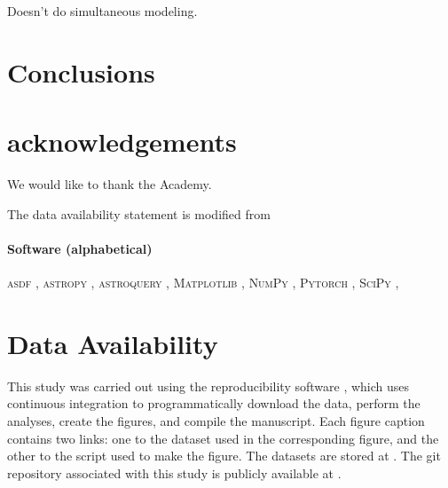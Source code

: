 \documentclass[twocolumn]{aastex631}
\newcommand{\package}[1]{\textsc{#1}}
\begin{document}
            Doesn't do simultaneous modeling.
    


\section{Conclusions} \label{sec:conclusions}




\section{acknowledgements}

    We would like to thank the Academy.

    The data availability statement is modified from 

    \paragraph{Software (alphabetical)}

        \package{asdf} \citep{Greenfield2015},
        \package{astropy} \citep{Astropy2013, Astropy2018, Astropy2022},
        \package{astroquery} \citep{Astroquery2019},
        \package{Matplotlib} \citep{Hunter2007},
        \package{NumPy} \citep{Harris2020},
        \package{Pytorch} \citep{Pytorch2019},
        \package{SciPy} \citep{Scipy2020},


\section*{Data Availability} \label{sec:data_availability}

    This study was carried out using the reproducibility software
    \href{https://github.com/showyourwork/showyourwork}{\showyourwork}
    \citep{Luger2021}, which uses continuous integration to
    programmatically download the data, perform the analyses, create the
    figures, and compile the manuscript. Each figure caption contains two links:
    one to the dataset used in the corresponding figure, and the other to the
    script used to make the figure. The datasets are stored at
    . The git repository associated
    with this study is publicly available at \GitHubURL{}.




\end{document}
